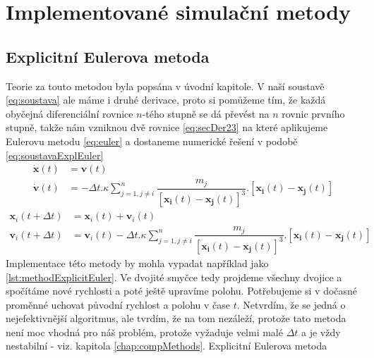 \chapter{Implementované simulační metody}
\section{Explicitní Eulerova metoda}
\label{sec:explEuler}
Teorie za touto metodou byla popsána v úvodní kapitole. V naší soustavě 
\eqref{eq:soustava} ale máme i druhé derivace, proto si pomůžeme tím, že každá obyčejná diferenciální rovnice $ n $-tého stupně se dá převést na $ n $ rovnic prvního stupně, takže nám vzniknou dvě rovnice \eqref{eq:secDer23} na které aplikujeme Eulerovu metodu \eqref{eq:euler} a dostaneme numerické řešení v podobě \eqref{eq:soustavaExplEuler}
\begin{subequations}
	\label{eq:secDer23}
	\begin{align}
	\label{eq:secDer2}
	\boldsymbol{\dot x}(t)&= \boldsymbol{v}(t) \\
	\label{eq:secDer3}
	\boldsymbol{\dot v}(t)&=- \Delta t . \kappa \sum_{j=1,j \neq i}^{n}\dfrac{m_j}
	{\left[ \boldsymbol{x_i}(t) - \boldsymbol{x_j}(t)\right] ^3} . 
	\left[ \boldsymbol{x_i}(t) - \boldsymbol{x_j}(t)\right] 
	\end{align}
\end{subequations}
\begin{subequations}\label{eq:soustavaExplEuler}
	\begin{align}
	\boldsymbol {x}_i(t+\Delta t)& =\boldsymbol{{x}}_i(t)  +\boldsymbol {v}_i(t)\\
	\boldsymbol {v}_i(t+\Delta t) &=\boldsymbol{{v}}_i(t)  - \Delta t . \kappa \sum_{j=1,j \neq i}^{n}\dfrac{m_j}
	{\left[ \boldsymbol{x_i}(t) - \boldsymbol{x_j}(t)\right] ^3} . 
	\left[ \boldsymbol{x_i}(t) - \boldsymbol{x_j}(t)\right] 
	\end{align}
\end{subequations}
Implementace této metody by mohla vypadat například jako \ref{lst:methodExplicitEuler}. Ve dvojité smyčce tedy projdeme všechny dvojice a spočítáme nové rychlosti a poté ještě upravíme polohu. Potřebujeme si v dočasné proměnné uchovat původní rychlost a polohu v čase $ t $. Netvrdím, že se jedná o nejefektivnější algoritmus, ale tvrdím, že na tom nezáleží, protože tato metoda není moc vhodná pro náš problém, protože vyžaduje velmi malé $ \Delta t $ a je vždy nestabilní - viz. kapitola \ref{chap:compMethods}.
{Explicitní Eulerova metoda}

